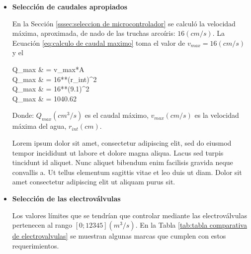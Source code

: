 \begin{itemize}
	\item \textbf{Selección de caudales apropiados} 
	
	En la Sección \ref{sssec:seleccion de microcontrolador} se calculó la velocidad máxima, aproximada, de nado de las truchas arcoíris: $16 (cm/s)$. La Ecuación \ref{eq:calculo de caudal maximo} toma el valor de \textit{$v_{max}=16 (cm/s)$}  y el 
	
	\begin{myequation}\label{eq:calculo de caudal maximo}
		\begin{split}
			Q_{max} & = v_{max}*A \\
			Q_{max} & = 16**(r_{int})^2 \\
			Q_{max} & = 16**(9.1)^2 \\
			Q_{max} & = 1040.62 
		\end{split}		
	\end{myequation}

	Donde: $Q_{max} (cm^3/s)$ es el caudal máximo, $v_{max} (cm/s)$ es la velocidad máxima del agua, $r_{int} (cm)$.
	
	Lorem ipsum dolor sit amet, consectetur adipiscing elit, sed do eiusmod tempor incididunt ut labore et dolore magna aliqua. Lacus sed turpis tincidunt id aliquet. Nunc aliquet bibendum enim facilisis gravida neque convallis a. Ut tellus elementum sagittis vitae et leo duis ut diam. Dolor sit amet consectetur adipiscing elit ut aliquam purus sit.	
	
	
	\item \textbf{Selección de las electroválvulas}
	
	Los valores límites que se tendrían que controlar mediante las electroválvulas pertenecen al rango $[0;12345] (m^3/s)$. En la Tabla \ref{tab:tabla comparativa de electrovalvulas} se muestran algunas marcas que cumplen con estos requerimientos.
	

\end{itemize}
